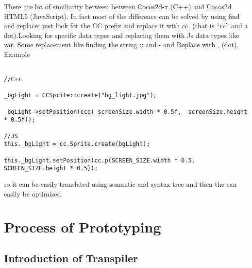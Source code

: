 \documentclass[23pt]{article}
\begin{document}
{\Large There are lot of similiarity between between Cocos2d-x (C++) and Cocos2d HTML5 (JavaScript). In fact  most of the difference can be solved by using find and replace: just look for the CC prefix and replace it with cc. (that is “cc” and a dot).Looking for specific data types and replacing them with Js data types like var. Some replacement like finding the string :: and - and Replace with . (dot). \\
Example \\  \\ \par}
\begin{lstlisting}[label=some-code,caption= Similarity between cocos2d-x c++ code and cocos2d-js code]
//C++
 
_bgLight = CCSprite::create("bg_light.jpg");
 
_bgLight->setPosition(ccp(_screenSize.width * 0.5f, _screenSize.height * 0.5f));
 
//JS
this._bgLight = cc.Sprite.create(bgLight);
 
this._bgLight.setPosition(cc.p(SCREEN_SIZE.width * 0.5, SCREEN_SIZE.height * 0.5));
\end{lstlisting}

{\Large so it can be easily translated using semantic and syntax tree and then the can easily be optimized. \\ \par}

\section{Process of Prototyping}

\subsection{Introduction of Transpiler}
\end{document}

